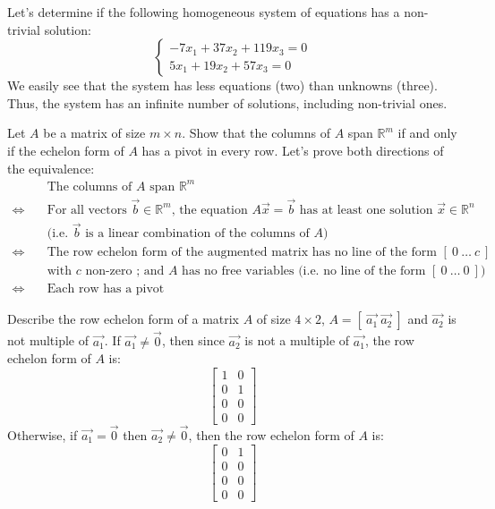 \begin{exercise}
    Let's determine if the following homogeneous system of equations has a non-trivial solution:
    \[
        \begin{cases}
            -7x_1 + 37x_2 + 119x_3 = 0 \\
            5x_1 + 19x_2 + 57x_3 = 0
        \end{cases}
    \]
    \Answer
    We easily see that the system has less equations (two) than unknowns (three). Thus, the system has an infinite number of solutions, including non-trivial ones.
\end{exercise}

\begin{exercise}
    Let $A$ be a matrix of size $m \times n$. Show that the columns of $A$ span $\mathbb{R}^m$ if and only if the echelon form of $A$ has a pivot in every row.
    \Answer
    Let's prove both directions of the equivalence:
    \begin{align*}
        &\text{The columns of $A$ span $\mathbb{R}^m$} \\
        \iff \quad &\text{For all vectors $\vec{b} \in \mathbb{R}^m$, the equation $A \vec{x} = \vec{b}$ has at least one solution $\vec{x} \in \mathbb{R}^n$} \\
        &\text{(i.e. $\vec{b}$ is a linear combination of the columns of $A$)} \\
        \iff \quad &\text{The row echelon form of the augmented matrix has no line of the form $\left[\ 0 \ \ldots \ c \ \right]$} \\
        &\text{with $c$ non-zero ; and $A$ has no free variables (i.e. no line of the form $\left[\ 0 \ \ldots \ 0 \ \right]$)} \\
        \iff \quad &\text{Each row has a pivot}
    \end{align*}
\end{exercise}

\begin{exercise}
    Describe the row echelon form of a matrix $A$ of size $4 \times 2$, $A = \left[\ \vec{a_1} \ \vec{a_2} \ \right]$ and $\vec{a_2}$ is not multiple of $\vec{a_1}$.
    \Answer
    If $\vec{a_1} \neq \vec{0}$, then since $\vec{a_2}$ is not a multiple of $\vec{a_1}$, the row echelon form of $A$ is:
    \[
        \begin{bmatrix}
            1 & 0 \\
            0 & 1 \\
            0 & 0 \\
            0 & 0
        \end{bmatrix}
    \]
    Otherwise, if $\vec{a_1} = \vec{0}$ then $\vec{a_2} \neq \vec{0}$, then the row echelon form of $A$ is:
    \[
        \begin{bmatrix}
            0 & 1 \\
            0 & 0 \\
            0 & 0 \\
            0 & 0
        \end{bmatrix}
    \]
\end{exercise}

